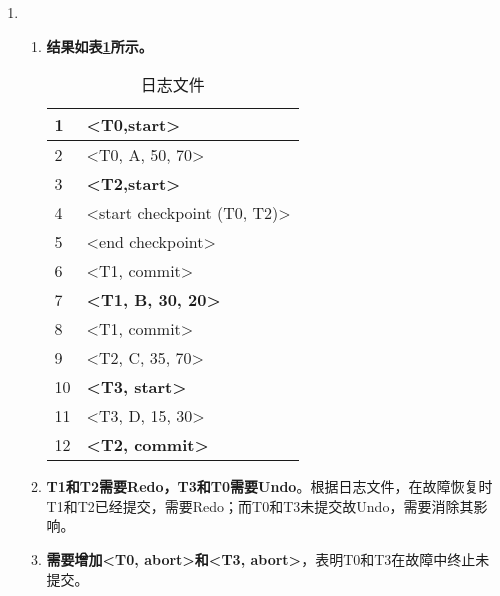 \documentclass[10pt, a4paper]{article}
\begin{document}
\begin{enumerate}
\begin{table}[htb]
			\end{table}
		\item \begin{enumerate}
			\item \textbf{结果如表\ref{tab:5_a}所示。}
			\begin{table}[htb]
				\centering
				\begin{tabular}{|l|l|}
				\hline
				1  & \textbf{\textless{}T0,start\textgreater{}}         \\ \hline
				2  & \textless{}T0, A, 50, 70\textgreater{}             \\ \hline
				3  & \textbf{\textless{}T2,start\textgreater{}}         \\ \hline
				4  & \textless{}start checkpoint (T0, T2)\textgreater{} \\ \hline
				5  & \textless{}end checkpoint\textgreater{}            \\ \hline
				6  & \textless{}T1, commit\textgreater{}                \\ \hline
				7  & \textbf{\textless{}T1, B, 30, 20\textgreater{}}    \\ \hline
				8  & \textless{}T1, commit\textgreater{}                \\ \hline
				9  & \textless{}T2, C, 35, 70\textgreater{}             \\ \hline
				10 & \textbf{\textless{}T3, start\textgreater{}}        \\ \hline
				11 & \textless{}T3, D, 15, 30\textgreater{}             \\ \hline
				12 & \textbf{\textless{}T2, commit\textgreater{}}       \\ \hline
				\end{tabular}
				\caption{日志文件}\label{tab:5_a}
				\end{table}
			\item \textbf{T1和T2需要Redo，T3和T0需要Undo}。根据日志文件，在故障恢复时T1和T2已经提交，需要Redo；而T0和T3未提交故Undo，需要消除其影响。
			\item \textbf{需要增加<T0, abort>和<T3, abort>}，表明T0和T3在故障中终止未提交。
		\end{enumerate}
	\end{enumerate}
\end{document}
